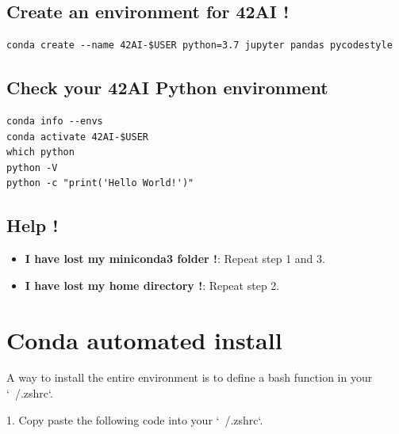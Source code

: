 \documentclass{42-en}
\begin{document}
\subsection*{Create an environment for 42AI !}
\begin{verbatim}
conda create --name 42AI-$USER python=3.7 jupyter pandas pycodestyle
\end{verbatim}
	
\subsection*{Check your 42AI Python environment}
\begin{verbatim}
conda info --envs
conda activate 42AI-$USER
which python
python -V
python -c "print('Hello World!')"
\end{verbatim}
	
\subsection*{Help !}
\begin{itemize}
	\item \textbf{I have lost my miniconda3 folder !}: Repeat step 1 and 3.
	\item \textbf{I have lost my home directory !}: Repeat step 2.
\end{itemize}

\section*{Conda automated install}

A way to install the entire environment is to define a bash function in your `~/.zshrc`.

1. Copy paste the following code into your `~/.zshrc`.
\end{document}
